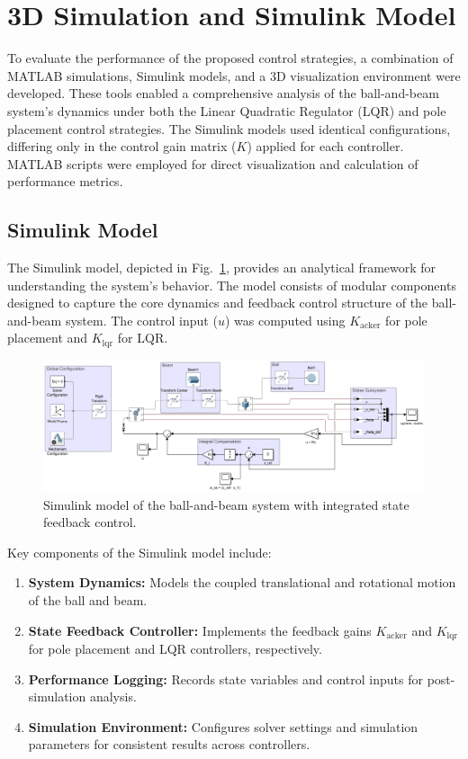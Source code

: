 \documentclass[conference]{IEEEtran}
\begin{document}
\section{3D Simulation and Simulink Model}
\label{sec:simulation_model}

To evaluate the performance of the proposed control strategies, a combination of MATLAB simulations, Simulink models, and a 3D visualization environment were developed. These tools enabled a comprehensive analysis of the ball-and-beam system's dynamics under both the Linear Quadratic Regulator (LQR) and pole placement control strategies. The Simulink models used identical configurations, differing only in the control gain matrix (\(K\)) applied for each controller. MATLAB scripts were employed for direct visualization and calculation of performance metrics.

\subsection{Simulink Model}
\label{subsec:simulink_model}

The Simulink model, depicted in Fig.~\ref{fig:simulink_model}, provides an analytical framework for understanding the system's behavior. The model consists of modular components designed to capture the core dynamics and feedback control structure of the ball-and-beam system. The control input (\(u\)) was computed using \(K_{\text{acker}}\) for pole placement and \(K_{\text{lqr}}\) for LQR.

\begin{figure}[H]
    \centering
    \includegraphics[width=\linewidth]{figures/simulink_model.png}
    \caption{Simulink model of the ball-and-beam system with integrated state feedback control.}
    \label{fig:simulink_model}
\end{figure}

Key components of the Simulink model include:
\begin{enumerate}
    \item \textbf{System Dynamics:} Models the coupled translational and rotational motion of the ball and beam.
    \item \textbf{State Feedback Controller:} Implements the feedback gains \(K_{\text{acker}}\) and \(K_{\text{lqr}}\) for pole placement and LQR controllers, respectively.
    \item \textbf{Performance Logging:} Records state variables and control inputs for post-simulation analysis.
    \item \textbf{Simulation Environment:} Configures solver settings and simulation parameters for consistent results across controllers.
\end{enumerate}
\end{document}
